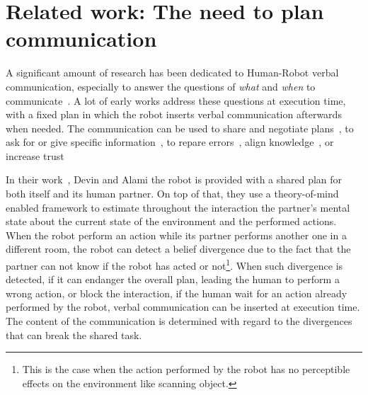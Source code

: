 \section[Related work]{Related work: The need to plan communication}

A significant amount of research has been dedicated to Human-Robot verbal communication, especially to answer the questions of \textit{what} and \textit{when} to communicate~\cite{mavridis_2015_review}. A lot of early works address these questions at execution time, with a fixed plan in which the robot inserts verbal communication afterwards when needed. The communication can be used to share and negotiate plans~\cite{sebastiani_2017_dealing}, to ask for or give specific information~\cite{shah_2011_improved}, to repare errors~\cite{tellex_2014_asking}, align knowledge~\cite{devin_2016_implemented}, or increase trust~\cite{schaefer_2017_communicating}

In their work~\cite{devin_2016_implemented}, Devin and Alami the robot is provided with a shared plan for both itself and its human partner. On top of that, they use a theory-of-mind enabled framework to estimate throughout the interaction the partner's mental state about the current state of the environment and the performed actions. When the robot perform an action while its partner performs another one in a different room, the robot can detect a belief divergence due to the fact that the partner can not know if the robot has acted or not\footnote{This is the case when the action performed by the robot has no perceptible effects on the environment like scanning object.}. When such divergence is detected, if it can endanger the overall plan, leading the human to perform a wrong action, or block the interaction, if the human wait for an action already performed by the robot, verbal communication can be inserted at execution time. The content of the communication is determined with regard to the divergences that can break the shared task.

